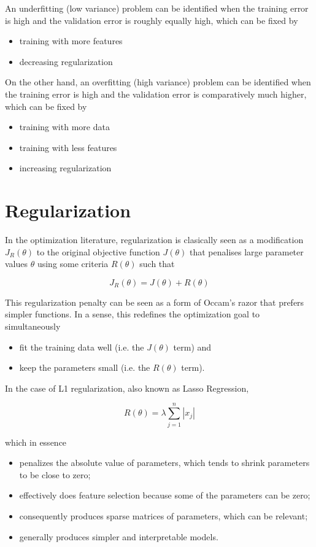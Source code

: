 An underfitting (low variance) problem can be identified when the training error is high and the validation error is roughly equally high, which can be fixed by

\begin{itemize}
    \item training with more features
    \item decreasing regularization
\end{itemize}

On the other hand, an overfitting (high variance) problem can be identified when the training error is high and the validation error is comparatively much higher, which can be fixed by

\begin{itemize}
    \item training with more data
    \item training with less features
    \item increasing regularization
\end{itemize}

\section{Regularization}

In the optimization literature, regularization is clasically seen as a modification $J_R(\theta)$ to the original objective function $J(\theta)$ that penalises large parameter values $\theta$ using some criteria $R(\theta)$ such that

$$
J_R(\theta) = J(\theta) + R(\theta)
$$

This regularization penalty can be seen as a form of Occam's razor that prefers simpler functions. In a sense, this redefines the optimization goal to simultaneously

\begin{itemize}
    \item fit the training data well (i.e. the $J(\theta)$ term) and
    \item keep the parameters small (i.e. the $R(\theta)$ term).
\end{itemize}

In the case of L1 regularization, also known as Lasso Regression,

$$
R(\theta) = \lambda \sum_{j=1}^{n} |x_j|
$$

which in essence

\begin{itemize}
    \item penalizes the absolute value of parameters, which tends to shrink parameters to be close to zero;
    \item effectively does feature selection because some of the parameters can be zero;
    \item consequently produces sparse matrices of parameters, which can be relevant;
    \item generally produces simpler and interpretable models.
\end{itemize}

